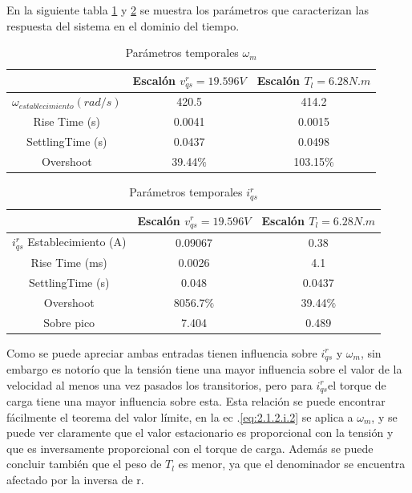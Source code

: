 \documentclass[10pt]{article}
\begin{document}
\begin{itemize}
	En la siguiente tabla \ref{tab:1} y \ref{tab:2} se muestra los parámetros que caracterizan las respuesta del sistema en el dominio del tiempo.
	\begin{table}[!h]
	\begin{center}
	\begin{tabular}{| c | c | c | }
	\hline
	  & Escalón $v^{r}_{qs}=19.596 V$& Escalón $T_{l}=6.28 N.m$\\ \hline
	 $\omega_{establecimiento} (rad/s)$ &  420.5 &  414.2 \\ \hline
	 Rise Time (s) &  0.0041 &  0.0015\\ \hline
	SettlingTime (s)& 0.0437 & 0.0498 \\ \hline
	Overshoot & 39.44$\%$ & 103.15$\%$ \\ \hline
	\end{tabular}
	\caption{Parámetros temporales $\omega_{m}$}
	\label{tab:1}
	\end{center}
	\end{table}
	
	\begin{table}[!h]
	\begin{center}
	\begin{tabular}{| c | c | c | }
	\hline
	  & Escalón $v^{r}_{qs}=19.596 V$& Escalón $T_{l}=6.28 N.m$\\ \hline
	 $ i^{r}_{qs}$ Establecimiento (A) &   0.09067 &  0.38 \\ \hline
	 Rise Time (ms) &  0.0026 &  4.1\\ \hline
	SettlingTime (s)& 0.048 & 0.0437 \\ \hline
	Overshoot & 8056.7$\%$ & 39.44$\%$ \\ \hline
	Sobre pico & 7.404 & 0.489 \\ \hline
	\end{tabular}
	\caption{Parámetros temporales $i^{r}_{qs}$}
	\label{tab:2}
	\end{center}
	\end{table}
	
	Como se puede apreciar ambas entradas tienen influencia sobre $ i^{r}_{qs}$ y $\omega_{m}$, sin embargo es notorío que la tensión tiene una mayor influencia sobre el valor de la velocidad al menos una vez pasados los transitorios, pero para $ i^{r}_{qs}$el torque de carga tiene una mayor influencia sobre esta. Esta relación se puede encontrar fácilmente el teorema del valor límite, en la ec .\ref{eq:2.1.2.i.2} se aplica a $\omega_{m}$, y se puede ver claramente que el valor estacionario es proporcional con la tensión y que es inversamente proporcional con el torque de carga. Además se puede concluir también que el peso de $T_{l}$ es menor, ya que el denominador se encuentra afectado por la inversa de r.
	

\end{itemize}
\end{document}
